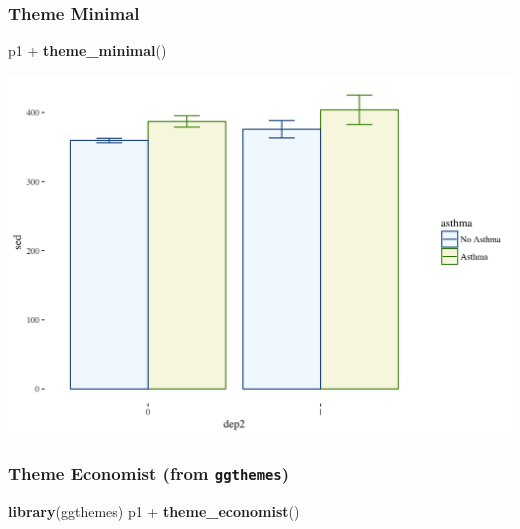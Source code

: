 \documentclass[]{tufte-book}
\newenvironment{Shaded}{}{}
\newcommand{\KeywordTok}[1]{\textcolor[rgb]{0.00,0.44,0.13}{\textbf{#1}}}
\newcommand{\StringTok}[1]{\textcolor[rgb]{0.25,0.44,0.63}{#1}}
\newcommand{\OperatorTok}[1]{\textcolor[rgb]{0.40,0.40,0.40}{#1}}
\newcommand{\NormalTok}[1]{#1}
\theoremstyle{definition}
\theoremstyle{definition}
\theoremstyle{remark}
\begin{document}
\subsubsection*{Theme Minimal}\label{theme-minimal}

\begin{Shaded}
\begin{Highlighting}[]
\NormalTok{p1 }\OperatorTok{+}\StringTok{ }\KeywordTok{theme_minimal}\NormalTok{()}
\end{Highlighting}
\end{Shaded}

\includegraphics{_main_files/figure-latex/unnamed-chunk-152-1}

\subsubsection*{\texorpdfstring{Theme Economist (from
\texttt{ggthemes})}{Theme Economist (from ggthemes)}}\label{theme-economist-from-ggthemes}

\begin{Shaded}
\begin{Highlighting}[]
\KeywordTok{library}\NormalTok{(ggthemes)}
\NormalTok{p1 }\OperatorTok{+}\StringTok{ }\KeywordTok{theme_economist}\NormalTok{()}
\end{Highlighting}
\end{Shaded}
\end{document}
